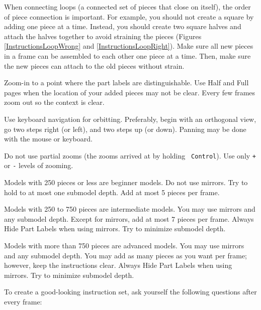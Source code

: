 \documentclass[12pt]{report}
\begin{document}
When connecting loops (a connected set of pieces that close on
itself), the order of piece connection is important.  For example, you
should not create a square by adding one piece at a time.  Instead,
you should create two square halves and attach the halves together to
avoid straining the pieces (Figures \ref{InstructionsLoopWrong} and
\ref{InstructionsLoopRight}).  Make sure all new pieces in a frame can
be assembled to each other one piece at a time.  Then, make sure the
new pieces can attach to the old pieces without strain.

Zoom-in to a point where the part labels are distinguishable.  Use
Half and Full pages when the location of your added pieces may not be
clear.  Every few frames zoom out so the context is clear.

Use keyboard navigation for orbitting.  Preferably, begin with an
orthogonal view, go two steps right (or left), and two steps up (or
down).  Panning may be done with the mouse or keyboard.

Do not use partial zooms (the zooms arrived at by holding {\tt
  Control}).  Use only {\tt +} or {\tt -} levels of zooming.

Models with 250 pieces or less are beginner models.  Do not use
mirrors.  Try to hold to at most one submodel depth.  Add at most 5
pieces per frame.

Models with 250 to 750 pieces are intermediate models.  You may use
mirrors and any submodel depth.  Except for mirrors, add at most 7
pieces per frame.  Always Hide Part Labels when using mirrors.  Try to
minimize submodel depth.

Models with more than 750 pieces are advanced models.  You may use
mirrors and any submodel depth.  You may add as many pieces as you
want per frame; however, keep the instructions clear.  Always Hide
Part Labels when using mirrors.  Try to minimize submodel depth.

To create a good-looking instruction set, ask yourself the following
questions after every frame:
\end{document}
